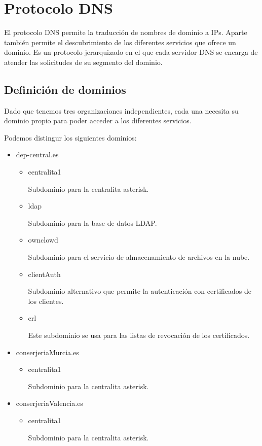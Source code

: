 \documentclass[a4paper]{article}
\begin{document}
\newpage

\section{Protocolo DNS}
El protocolo DNS permite la traducción de nombres de dominio a IPs. Aparte también permite el descubrimiento de los diferentes servicios que ofrece un dominio. Es un protocolo jerarquizado en el que cada servidor DNS se encarga de atender las solicitudes de su segmento del dominio.

\subsection{Definición de dominios}
Dado que tenemos tres organizaciones independientes, cada una necesita su dominio propio para poder acceder a los diferentes servicios.

Podemos distingur los siguientes dominios:
\begin{itemize}
	\item dep-central.es
		\begin{itemize}
			\item centralita1
			
			Subdominio para la centralita asterisk.
			\item ldap
			
			Subdominio para la base de datos LDAP.
			\item ownclowd
			
			Subdominio para el servicio de almacenamiento de archivos en la nube.
			\item clientAuth
			
			Subdominio alternativo que permite la autenticación con certificados de los clientes.
			\item crl
			
			Este subdominio se usa para las listas de revocación de los certificados.
		\end{itemize}
	\item conserjeriaMurcia.es
		\begin{itemize}
			\item centralita1
			
			Subdominio para la centralita asterisk.
		\end{itemize}
	\item conserjeriaValencia.es
	\begin{itemize}
		\item centralita1
		
		Subdominio para la centralita asterisk.
	\end{itemize}
\end{itemize}
\end{document}
